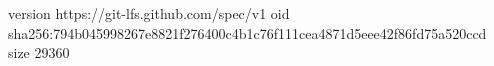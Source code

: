 version https://git-lfs.github.com/spec/v1
oid sha256:794b045998267e8821f276400c4b1c76f111cea4871d5eee42f86fd75a520ccd
size 29360
